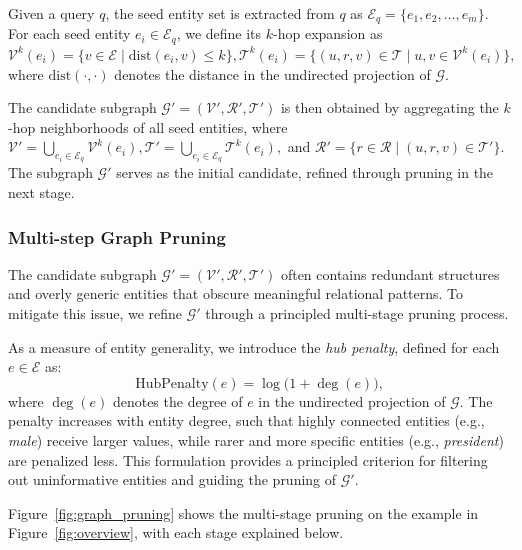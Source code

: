Given a query $q$, the seed entity set is extracted from $q$ as $\mathcal{E}_q = \{e_1, e_2, \dots, e_m\}$.
For each seed entity $e_i \in \mathcal{E}_q$, we define its $k$-hop expansion as
{\small
$
\mathcal{V}^k(e_i) = \{ v \in \mathcal{E} \mid \mathrm{dist}(e_i,v) \leq k \},
\mathcal{T}^k(e_i) = \{ (u,r,v) \in \mathcal{T} \mid u,v \in \mathcal{V}^k(e_i) \},
$}
where $\mathrm{dist}(\cdot,\cdot)$ denotes the distance in the undirected projection of $\mathcal{G}$.


The candidate subgraph $\mathcal{G}' = (\mathcal{V}', \mathcal{R}', \mathcal{T}')$ is then obtained by aggregating the $k$-hop neighborhoods of all seed entities, where 
\small
$
\mathcal{V}' = \bigcup\nolimits_{e_i \in \mathcal{E}_q} \mathcal{V}^k(e_i), 
\mathcal{T}' = \bigcup\nolimits_{e_i \in \mathcal{E}_q} \mathcal{T}^k(e_i),
$
\normalsize
and
\small
$
\mathcal{R}' = \{ r \in \mathcal{R} \mid (u,r,v) \in \mathcal{T}' \}.
$
\normalsize
The subgraph $\mathcal{G}'$ serves as the initial candidate, refined through pruning in the next stage.





\subsubsection{Multi-step Graph Pruning}
\label{sec:prune}
The candidate subgraph $\mathcal{G}' = (\mathcal{V}', \mathcal{R}', \mathcal{T}')$  
often contains redundant structures and overly generic entities that obscure meaningful relational patterns.  
To mitigate this issue, we refine $\mathcal{G}'$ through a principled multi-stage pruning process.  

As a measure of entity generality, we introduce the \textit{hub penalty}, defined for each $e \in \mathcal{E}$ as:
{\small
\begin{equation}\label{eq:hub_penalty}
    \mathrm{HubPenalty}(e) = \log \big( 1 + \deg(e) \big),
\end{equation}
}
where $\deg(e)$ denotes the degree of $e$ in the undirected projection of $\mathcal{G}$.  
The penalty increases with entity degree, such that highly connected entities (e.g., \textit{male}) 
receive larger values, while rarer and more specific entities (e.g., \textit{president}) are penalized less.
This formulation provides a principled criterion for filtering out uninformative entities and guiding the pruning of $\mathcal{G}'$.



Figure~\ref{fig:graph_pruning} shows the multi-stage pruning on the example in Figure~\ref{fig:overview}, with each stage explained below.

